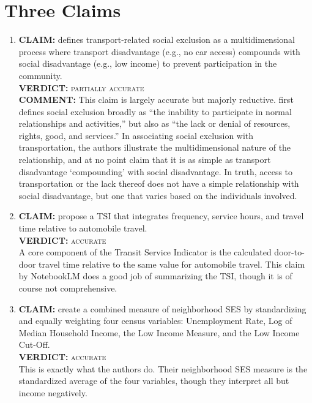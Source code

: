 \documentclass[12pt]{article}
\begin{document}
\section{Three Claims}
\begin{enumerate}
    \item \textbf{CLAIM:} \citet{lucasTransportSocialExclusion2012} defines transport-related social exclusion as a multidimensional process where transport disadvantage (e.g., no car access) compounds with social disadvantage (e.g., low income) to prevent participation in the community.
    \\ \textbf{VERDICT:} \textsc{partially accurate}
    \\ \textbf{COMMENT:} This claim is largely accurate but majorly reductive.
    \citet[106]{lucasTransportSocialExclusion2012} first defines social exclusion broadly as ``the inability to participate in normal relationships and activities,'' but also as ``the lack or denial of resources, rights, good, and services.''
    In associating social exclusion with transportation, the authors illustrate the multidimensional nature of the relationship, and at no point claim that it is as simple as transport disadvantage `compounding' with social disadvantage.
    In truth, access to transportation or the lack thereof does not have a simple relationship with social disadvantage, but one that varies based on the individuals involved.
    \item \textbf{CLAIM:} \citet{fuNewPerformanceIndex2007} propose a TSI that integrates frequency, service hours, and travel time relative to automobile travel.
    \\ \textbf{VERDICT:} \textsc{accurate}
    \\ A core component of the Transit Service Indicator is the calculated door-to-door travel time relative to the same value for automobile travel.
    This claim by NotebookLM does a good job of summarizing the TSI, though it is of course not comprehensive.
    \item \textbf{CLAIM:} \citet{allenSizingTransportPoverty2019} create a combined measure of neighborhood SES by standardizing and equally weighting four census variables: Unemployment Rate, Log of Median Household Income, the Low Income Measure, and the Low Income Cut-Off.
    \\ \textbf{VERDICT:} \textsc{accurate}
    \\ This is exactly what the authors do.
    Their neighborhood SES measure is the standardized average of the four variables, though they interpret all but income negatively.
\end{enumerate}
\end{document}
